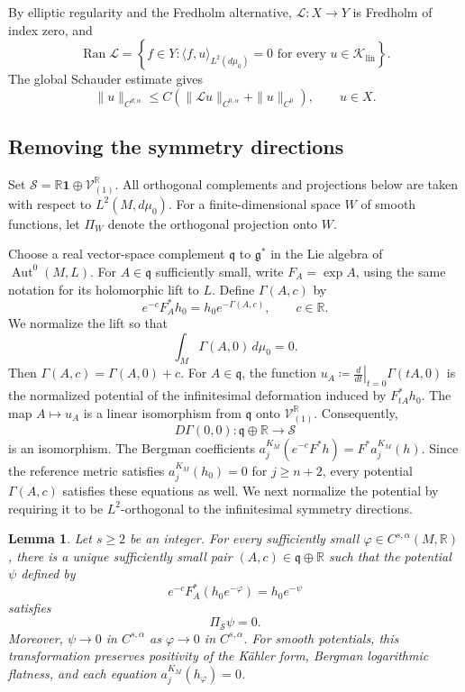 \documentclass[11pt,reqno]{amsart}
\newtheorem{lemma}[theorem]{Lemma}
\theoremstyle{corollary}
\theoremstyle{conjecture}
\theoremstyle{assumption}
\theoremstyle{proposition}
\theoremstyle{remark}
\numberwithin{equation}{section}
\begin{document}
By elliptic regularity and the Fredholm alternative, $\mathcal L\colon X\longrightarrow Y$ is Fredholm of index zero, and
\[
\operatorname{Ran}\mathcal L=\left\{f\in Y\colon\langle f,u\rangle_{L^2(d\mu_0)}=0\text{ for every }u\in\mathcal K_{\operatorname{lin}}\right\}.
\]
The global Schauder estimate gives
\[
\|u\|_{C^{d,\alpha}}\leq C\left(\|\mathcal Lu\|_{C^{0,\alpha}}+\|u\|_{C^0}\right),\qquad u\in X.
\]

\subsection{Removing the symmetry directions}
\label{subsec:symmetry-directions}
Set $\mathcal S=\mathbb R\mathbf 1\oplus\mathcal V_{(1)}^{\mathbb R}$. All orthogonal complements and projections below are taken with respect to $L^2(M,d\mu_0)$. For a finite-dimensional space $W$ of smooth functions, let $\Pi_W$ denote the orthogonal projection onto $W$. 

Choose a real vector-space complement $\mathfrak q$ to $\mathfrak g^*$ in the Lie algebra of $\operatorname{Aut}^0(M,L)$. For $A\in\mathfrak q$ sufficiently small, write $F_A=\exp A$, using the same notation for its holomorphic lift to $L$. Define $\Gamma(A,c)$ by
\begin{equation}\label{eq:local-symmetry-potential}
e^{-c}F_A^*h_0=h_0e^{-\Gamma(A,c)},\qquad c\in\mathbb R.
\end{equation}
We normalize the lift so that
\[
\int_M\Gamma(A,0)\,d\mu_0=0.
\]
Then $\Gamma(A,c)=\Gamma(A,0)+c$. For $A\in\mathfrak q$, the function $u_A\coloneq\left.\frac{d}{dt}\right|_{t=0}\Gamma(tA,0)$ is the normalized potential of the infinitesimal deformation induced by $F_{tA}^*h_0$. The map $A\mapsto u_A$ is a linear isomorphism from $\mathfrak q$ onto $\mathcal V_{(1)}^{\mathbb R}$. Consequently,
\begin{equation}\label{eq:symmetry-orbit-differential}
D\Gamma(0,0)\colon\mathfrak q\oplus\mathbb R\longrightarrow\mathcal S
\end{equation}
is an isomorphism. The Bergman coefficients $a^{K_M}_j(e^{-c}F^*h)=F^*a^{K_M}_j(h)$. Since the reference metric satisfies $a^{K_M}_j(h_0)=0$ for $j\geq n+2$, every potential $\Gamma(A,c)$ satisfies these equations as well. We next normalize the potential by requiring it to be $L^2$-orthogonal to the infinitesimal symmetry directions. 

\begin{lemma}\label{lem:local-moment-slice}
Let $s\geq2$ be an integer. For every sufficiently small $\varphi\in C^{s,\alpha}(M,\mathbb R)$, there is a unique sufficiently small pair
$(A,c)\in\mathfrak q\oplus\mathbb R$ such that the potential $\psi$ defined by
\[
e^{-c}F_A^*(h_0e^{-\varphi})=h_0e^{-\psi}
\]
satisfies
\[
\Pi_{\mathcal S}\psi=0.
\]
Moreover, $\psi\rightarrow 0$ in $C^{s,\alpha}$ as $\varphi\rightarrow 0$ in $C^{s,\alpha}$. For smooth potentials, this transformation preserves positivity of the K\"ahler form, Bergman logarithmic flatness, and each equation $a^{K_M}_j(h_\varphi)=0$.
\end{lemma}
\end{document}
